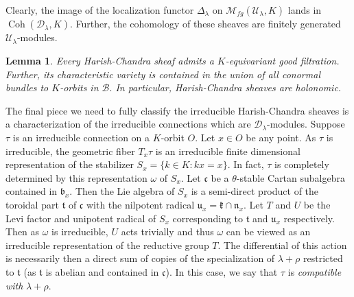 \documentclass[letterpaper,twosided,11pt]{article}
\theoremstyle{plain}
\newtheorem{lemma}[theorem]{Lemma}
\theoremstyle{definition}
\theoremstyle{remark}
\newcommand{\lie}[1]{\mathfrak{#1}}
\begin{document}
Clearly, the image of the localization functor $ \Delta_\lambda $ on $
\mathcal{M}_{fg}(\mathcal{U}_\lambda,K) $ lands in $
\operatorname{Coh}
(\mathcal{D}_\lambda,K). $ Further, the cohomology of these sheaves are
finitely generated $ \mathcal{U}_\lambda $-modules.

\begin{lemma}
    \cite[pg.  88]{MilicicLocalization} Every Harish-Chandra sheaf
    admits a $ K $-equivariant good filtration.  Further, its
    characteristic variety is contained in the union of all conormal
    bundles to $ K $-orbits in $ \mathcal{B}. $ In particular,
    Harish-Chandra sheaves are holonomic.
\end{lemma}

The final piece we need to fully classify the irreducible Harish-Chandra
sheaves is a characterization of the irreducible connections which are $
\mathcal{D}_\lambda $-modules.  Suppose $ \tau $ is an irreducible
connection on a $ K $-orbit $ O. $ Let $ x\in O $ be any point.  As $
\tau $ is irreducible, the geometric fiber $ T_x\tau $ is an irreducible
finite dimensional representation of the stabilizer $ S_x=\{k\in K:
kx=x\}. $ In fact, $ \tau $ is completely determined by this
representation $ \omega $ of $ S_x. $ Let $ \lie{c} $ be a $ \theta $-stable
Cartan subalgebra contained in $ \lie{b}_x. $ Then the Lie algebra of $
S_x $ is a semi-direct product of the toroidal part $ \lie{t} $ of $
\lie{c} $ with the nilpotent radical $ \lie{u}_x=\lie{k}\cap \lie{n}_x. $
Let $ T $ and $ U $ be the Levi factor and unipotent radical of $ S_x $
corresponding to $ \lie{t} $ and $ \lie{u}_x $ respectively.  Then as $
\omega $ is irreducible, $ U $ acts trivially and thus $ \omega $ can be
viewed as an irreducible representation of the reductive group $ T. $
The differential of this action is necessarily then a direct sum of
copies of the specialization of $ \lambda+\rho $ restricted to $ \lie{t}
$ (as $ \lie{t} $ is abelian and contained in $ \lie{c} $).  In this
case, we say that $ \tau $ is \textit{compatible with} $ \lambda+\rho. $
\end{document}
